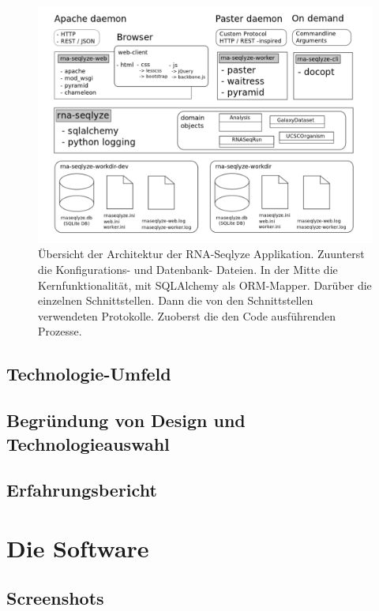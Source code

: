 \documentclass[a4paper]{thesis}
\begin{document}
\begin{figure}[h]
\includegraphics{img/overview_architektur}
\caption[Applikationsarchitektur]{
	Übersicht der Architektur der RNA-Seqlyze Applikation.
	Zuunterst die Konfigurations- und Datenbank- Dateien.
	In der Mitte die Kernfunktionalität, mit SQLAlchemy
	als ORM-Mapper. Darüber die einzelnen Schnittstellen.
	Dann die von den Schnittstellen verwendeten Protokolle.
	Zuoberst die den Code ausführenden Prozesse.
}
\label{fig:arch}
\end{figure}

\subsection{Technologie-Umfeld}

\subsection{Begründung von Design und Technologieauswahl}

\subsection{Erfahrungsbericht}

\section{Die Software}

\subsection{Screenshots}
\end{document}
